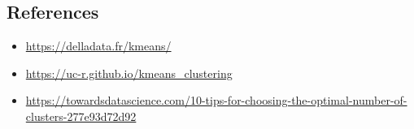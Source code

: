 \documentclass[
]{article}
\begin{document}
\hypertarget{references}{%
\subsection{References}\label{references}}

\begin{itemize}
\item
  \url{https://delladata.fr/kmeans/}
\item
  \url{https://uc-r.github.io/kmeans_clustering}
\item
  \url{https://towardsdatascience.com/10-tips-for-choosing-the-optimal-number-of-clusters-277e93d72d92}
\end{itemize}
\end{document}
